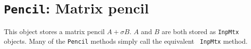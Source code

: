 \par
\chapter{{\tt Pencil}: Matrix pencil}
\par
This object stores a matrix pencil $A + \sigma B$.
$A$ and $B$ are both stored as {\tt InpMtx} objects.
Many of the {\tt Pencil} methods simply call the equivalent {\tt
InpMtx} method.
